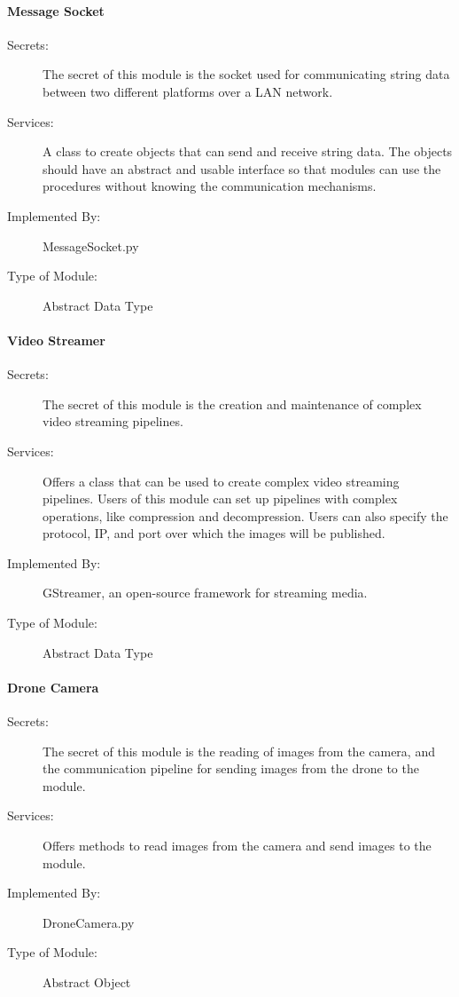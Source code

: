 \documentclass[12pt, titlepage]{article}
\begin{document}
\paragraph{Message Socket}
\label{Message Socket}
\begin{description}
\item[Secrets:] The secret of this module is the socket used for communicating string data between two
different platforms over a LAN network.
\item[Services:] A class to create objects that can send and receive string data. The objects should have an abstract and usable interface so that modules can use the procedures without knowing the communication mechanisms.
\item[Implemented By:] MessageSocket.py
\item[Type of Module:] Abstract Data Type
\end{description}

\paragraph{Video Streamer}
\label{GStreamer}
\begin{description}
\item[Secrets:] The secret of this module is the creation and maintenance of complex video streaming pipelines.
\item[Services:] Offers a class that can be used to create complex video streaming pipelines. Users of this module can set up pipelines with complex operations, like compression and decompression. Users can also specify the protocol, IP, and port over which the images will be published.
\item[Implemented By:] GStreamer, an open-source framework for streaming media.
\item[Type of Module:] Abstract Data Type
\end{description}

\paragraph{Drone Camera}
\label{Drone Camera}
\begin{description}
\item[Secrets:] The secret of this module is the reading of  images from the camera, and the communication pipeline for sending images from the drone to the  module.
\item[Services:] Offers methods to read images from the camera and send images to the  module.
\item[Implemented By:] DroneCamera.py
\item[Type of Module:] Abstract Object
\end{description}
\end{document}
